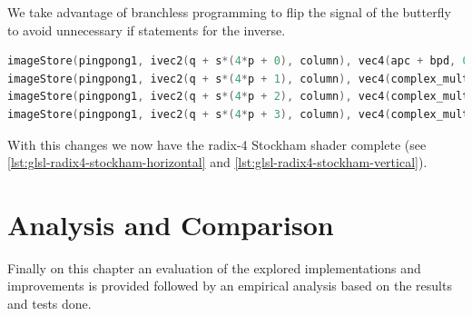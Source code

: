 \documentclass[
  oneside,
  11pt, a4paper,
  footinclude=true,
  headinclude=true,
  cleardoublepage=empty
]{scrbook}
\begin{document}
We take advantage of branchless programming to flip the signal of the butterfly to avoid unnecessary if statements for the inverse.

\begin{lstlisting}[language=C, caption={Radix-4 Stockham dragonfly inverse arithmetic}, label={lst:radix4-stockham-dragonfly-arithmetic}]
imageStore(pingpong1, ivec2(q + s*(4*p + 0), column), vec4(apc + bpd, 0,0));
imageStore(pingpong1, ivec2(q + s*(4*p + 1), column), vec4(complex_mult(w1p, amc + jbmd*fft_dir), 0,0));
imageStore(pingpong1, ivec2(q + s*(4*p + 2), column), vec4(complex_mult(w2p, apc - bpd ), 0,0));
imageStore(pingpong1, ivec2(q + s*(4*p + 3), column), vec4(complex_mult(w3p, amc - jbmd*fft_dir), 0,0));
\end{lstlisting}


With this changes we now have the radix-4 Stockham shader complete (see \autoref{lst:glsl-radix4-stockham-horizontal} and \autoref{lst:glsl-radix4-stockham-vertical}).







\chapter{Analysis and Comparison}

Finally on this chapter an evaluation of the explored implementations and improvements is provided followed by an empirical analysis based on the results and tests done. 
\end{document}
